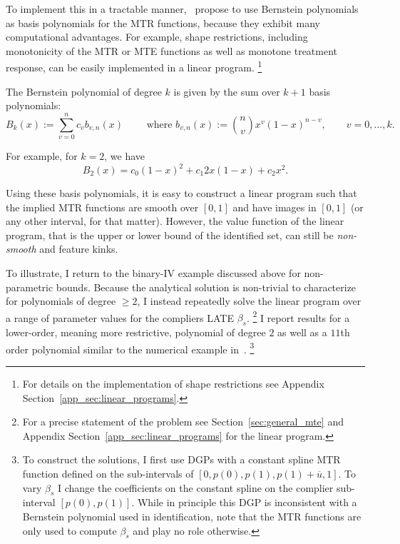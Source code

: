\documentclass[12pt,a4paper,english]{article} %
\numberwithin{equation}{section}
\numberwithin{figure}{section}
\numberwithin{table}{section}
\begin{document}
To implement this in a tractable manner,~\cite{mogstad2018using} propose to use Bernstein polynomials as basis polynomials for the MTR functions, because they exhibit many computational advantages.
For example, shape restrictions, including monotonicity of the MTR or MTE functions as well as monotone treatment response, can be easily implemented in a linear program.
\footnote{For details on the implementation of shape restrictions see Appendix Section~\ref{app_sec:linear_programs}.}

The Bernstein polynomial of degree $k$ is given by the sum over $k+1$ basis polynomials:
\begin{equation*}
  B_k(x) := \sum_{v=0}^n c_v b_{v,n}(x) \qquad \text{ where } b_{v,n}(x) := \binom{n}{v} x^v(1-x)^{n-v}, \qquad v = 0, \ldots, k.
\end{equation*}

For example, for $k=2$, we have
\begin{equation*}
  B_2(x) = c_0 (1-x)^2 + c_1 2x(1-x) + c_2 x^2.
\end{equation*}

Using these basis polynomials, it is easy to construct a linear program such that the implied MTR functions are smooth over $[0,1]$ and have images in $[0,1]$ (or any other interval, for that matter).
However, the value function of the linear program, that is the upper or lower bound of the identified set, can still be \textit{non-smooth} and feature kinks.

To illustrate, I return to the binary-IV example discussed above for non-parametric bounds.
Because the analytical solution is non-trivial to characterize for polynomials of degree $\geq2$, I instead repeatedly solve the linear program over a range of parameter values for the compliers LATE $\beta_s$.
\footnote{For a precise statement of the problem see Section~\ref{sec:general_mte} and Appendix Section~\ref{app_sec:linear_programs} for the linear program.}
I report results for a lower-order, meaning more restrictive, polynomial of degree $2$ as well as a $11$th order polynomial similar to the numerical example in~\cite{mogstad2018using}.
\footnote{
  To construct the solutions, I first use DGPs with a constant spline MTR function defined on the sub-intervals of $[0, p(0), p(1), p(1) + \overline{u}, 1]$.
  To vary $\beta_s$ I change the coefficients on the constant spline on the complier sub-interval $[p(0), p(1)]$.
  While in principle this DGP is inconsistent with a Bernstein polynomial used in identification,
  note that the MTR functions are only used to compute $\beta_s$ and play no role otherwise.
}
\end{document}
